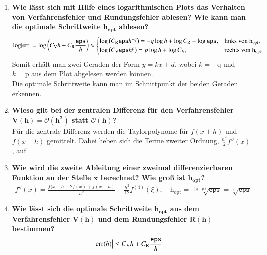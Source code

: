 \begin{enumerate}
\begin{figure}[!htbp]
\begin{minipage}{.5\textwidth}
				\end{minipage}
			\end{figure}			
		\item \textbf{Wie lässt sich mit Hilfe eines logarithmischen Plots das Verhalten von Verfahrensfehler und Rundungsfehler ablesen? Wie kann man die optimale Schrittweite \(\mathbf{h_{opt}}\) ablesen?}
			\begin{align*}
				\log \abs{\text{err}}=\log \left( C_\text{V} h + C_\text{R} \frac{\texttt{eps}}{h}\right) \approx 
					\begin{cases}
						\log\left(C_\text{R}\texttt{eps}h^{-q}\right) =-q\log h + \log C_\text{R}+\log\texttt{eps}  , & \text{links von }  \text{h}_\text{opt},\\
						\log\left(C_\text{V}\texttt{eps}h^p\right) =p\log h + \log C_\text{V} , & \text{rechts von }  \text{h}_\text{opt}.		\\	
					\end{cases}
			\end{align*}
			Somit erhält man zwei Geraden der Form \(y=kx+d\), wobei \(k=-\text{q}\) und \(k=\text{p}\) aus dem Plot abgelesen werden können.\\
			Die optimale Schrittweite kann man im Schnittpunkt der beiden Geraden erkennen. 
		\item \textbf{Wieso gilt bei der zentralen Differenz für den Verfahrensfehler \(\mathbf{V(h)=\mathcal{O}(h^2)}\) statt \(\mathbf{\mathcal{O}(h)}\)?}\\
			Für die zentrale Differenz werden die Taylorpolynome für \(f(x+h)\) und \(f(x-h)\) gemittelt. Dabei heben sich die Terme zweiter Ordnung, \(\frac{h^2}{2}f''(x)\), auf.
		\item \textbf{Wie wird die zweite Ableitung einer zweimal differenzierbaren Funktion an der Stelle \(\mathbf{x}\) berechnet? Wie groß ist \(\mathbf{h_{opt}}\)?}
			\begin{align*}
				f''(x)=\frac{f(x+h-2f(x)+f(x-h)}{h^2}-\frac{h^2}{12}f^{(4)}(\xi), \quad \text{h}_\text{opt}=\sqrt[\left( \text{q}+\text{p}\right) ]{\texttt{eps}}=\sqrt[4]{\texttt{eps}}
			\end{align*}
		\item \textbf{Wie lässt sich die optimale Schrittweite \(\mathbf{h_{opt}}\) aus dem Verfahrensfehler \(\mathbf{V(h)}\) und dem Rundungsfehler \(\mathbf{R(h)}\) bestimmen?}
			\begin{align*}
				\abs{\text{err}(h)}&\leq C_\text{V} h + C_\text{R} \frac{\texttt{eps}}{h}
			\end{align*}

\end{enumerate}
